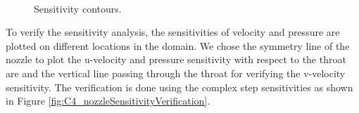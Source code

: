 \begin{figure}[H]
    \centering
    \quad
    \\
    \caption{Sensitivity contours.}
    \label{fig:C4_nozzleFlow_sensitivityPlots}
\end{figure}

To verify the sensitivity analysis, the sensitivities of velocity and pressure are plotted on different locations in the domain. We chose the symmetry line of the nozzle to plot the u-velocity and pressure sensitivity with respect to the throat are and the vertical line passing through the throat for verifying the v-velocity sensitivity. The verification is done using the complex step sensitivities as shown in Figure \ref{fig:C4_nozzleSensitivityVerification}.

